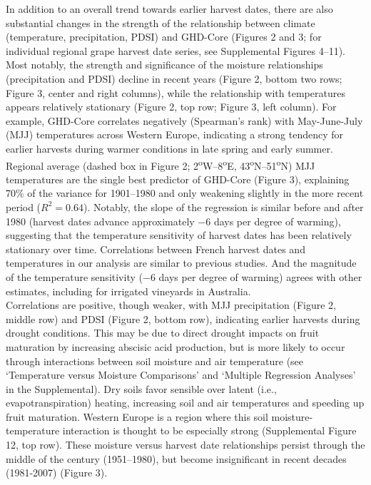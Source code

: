 \documentclass[final]{nature}
\begin{document}
\indent In addition to an overall trend towards earlier harvest dates, there are also substantial changes in the strength of the relationship between climate (temperature, precipitation, PDSI) and GHD-Core (Figures 2 and 3; for individual regional grape harvest date series, see Supplemental Figures 4--11). Most notably, the strength and significance of the moisture relationships (precipitation and PDSI) decline in recent years (Figure 2, bottom two rows; Figure 3, center and right columns), while the relationship with temperatures appears relatively stationary (Figure 2, top row; Figure 3, left column). For example, GHD-Core correlates negatively (Spearman's rank) with May-June-July (MJJ) temperatures across Western Europe, indicating a strong tendency for earlier harvests during warmer conditions in late spring and early summer. Regional average (dashed box in Figure 2; 2\textsuperscript{o}W--8\textsuperscript{o}E, 43\textsuperscript{o}N--51\textsuperscript{o}N) MJJ temperatures are the single best predictor of GHD-Core (Figure 3), explaining 70\% of the variance for 1901--1980 and only weakening slightly in the more recent period ($R^2=0.64$). Notably, the slope of the regression is similar before and after 1980 (harvest dates advance approximately $-6$ days per degree of warming), suggesting that the temperature sensitivity of harvest dates has been relatively stationary over time. Correlations between French harvest dates and temperatures in our analysis are similar to previous studies\cite{Chuine2004}. And the magnitude of the temperature sensitivity ($-6$ days per degree of warming) agrees with other estimates, including for irrigated vineyards in Australia\cite{webb2012}.\\ 
\indent Correlations are positive, though weaker, with MJJ precipitation (Figure 2, middle row) and PDSI (Figure 2, bottom row), indicating earlier harvests during drought conditions. This may be due to direct drought impacts on fruit maturation by increasing abscisic acid production\cite{webb2012}, but is more likely to occur through interactions between soil moisture and air temperature (see `Temperature versus Moisture Comparisons' and `Multiple Regression Analyses' in the Supplemental). Dry soils favor sensible over latent (i.e., evapotranspiration) heating, increasing soil and air temperatures and speeding up fruit maturation. Western Europe is a region where this soil moisture-temperature interaction is thought to be especially strong\cite{Seneviratne2006} (Supplemental Figure 12, top row). These moisture versus harvest date relationships persist through the middle of the century (1951--1980), but become insignificant in recent decades (1981-2007) (Figure 3).\\
\end{document}
